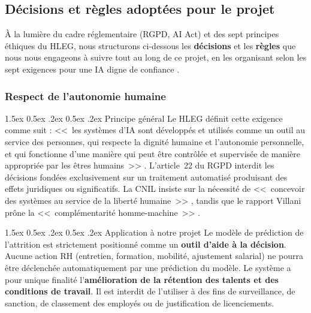 \documentclass[12pt,a4paper]{article}
\makeatletter
\renewcommand\paragraph{\@startsection{paragraph}{4}{\z@}%
  {1.5ex \@plus 0.5ex \@minus .2ex}%
  {0.5ex \@plus .2ex}%
  {\normalfont\normalsize\bfseries}}
\makeatother
\begin{document}
\subsection{Décisions et règles adoptées pour le projet}

À la lumière du cadre réglementaire (RGPD, AI Act) et des sept principes éthiques du HLEG, nous structurons ci-dessous les \textbf{décisions} et les \textbf{règles} que nous nous engageons à suivre tout au long de ce projet, en les organisant selon les sept exigences pour une IA digne de confiance \cite{eu_hleg, ia_act}.

\subsubsection{Respect de l'autonomie humaine}

\paragraph{Principe général}
Le HLEG définit cette exigence comme suit : <<~les systèmes d'IA sont développés et utilisés comme un outil au service des personnes, qui respecte la dignité humaine et l'autonomie personnelle, et qui fonctionne d'une manière qui peut être contrôlée et supervisée de manière appropriée par les êtres humains~>> \cite{ia_act}. L'article~22 du RGPD interdit les décisions fondées exclusivement sur un traitement automatisé produisant des effets juridiques ou significatifs. La CNIL insiste sur la nécessité de <<~concevoir des systèmes au service de la liberté humaine~>> \cite{cnil_ethique}, tandis que le rapport Villani prône la <<~complémentarité homme-machine~>> \cite{villani}.

\paragraph{Application à notre projet}
Le modèle de prédiction de l'attrition est strictement positionné comme un \textbf{outil d'aide à la décision}. Aucune action RH (entretien, formation, mobilité, ajustement salarial) ne pourra être déclenchée automatiquement par une prédiction du modèle. Le système a pour unique finalité l'\textbf{amélioration de la rétention des talents et des conditions de travail}. Il est interdit de l'utiliser à des fins de surveillance, de sanction, de classement des employés ou de justification de licenciements.
\end{document}
